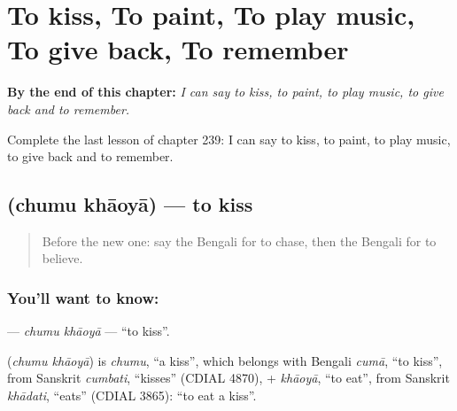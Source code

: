 
\chapter{To kiss, To paint, To play music, To give back, To remember}
\label{ch:bn-to-kiss-to-paint-to-play-music-to-give-back-to-remember}

\begin{chapteropening}
\textbf{By the end of this chapter:} \emph{I can say to kiss, to paint, to play music, to give back and to remember.}

Complete the last lesson of chapter 239: I can say to kiss, to paint, to play music, to give back and to remember.
\end{chapteropening}

\section[\texorpdfstring{\bn{চুমু} \bn{খাওয়া} (chumu khāoyā)}{চুমু খাওয়া (chumu khāoyā)}]{  (chumu khāoyā) — to kiss}

\label{lesson:BN-C239-chumu-khaoya}



\begin{quote}
Before the new one: say the Bengali for to chase, then the Bengali for to believe.
\end{quote}

\subsection*{You'll want to know:  }
\textbf{ } — \emph{chumu khāoyā} — \textquotedblleft{}to kiss\textquotedblright{}.

\begin{cousinweb}
\textbf{ } (\emph{chumu khāoyā}) is \emph{chumu}, \textquotedblleft{}a kiss\textquotedblright{}, which belongs with Bengali \emph{cumā}, \textquotedblleft{}to kiss\textquotedblright{}, from Sanskrit \emph{cumbati}, \textquotedblleft{}kisses\textquotedblright{} (CDIAL 4870), + \emph{khāoyā}, \textquotedblleft{}to eat\textquotedblright{}, from Sanskrit \emph{khādati}, \textquotedblleft{}eats\textquotedblright{} (CDIAL 3865): \textquotedblleft{}to eat a kiss\textquotedblright{}.
\end{cousinweb}

